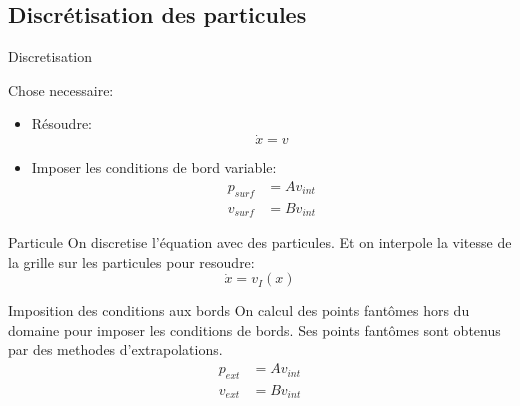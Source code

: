 \subsection{Discrétisation des particules}
\begin{frame}{Discretisation}

\begin{block}{Chose necessaire:}
 \begin{itemize}
  \item Résoudre:
  \begin{equation*}
   \dot{x}=v
  \end{equation*}
  \item Imposer les conditions de bord variable:
   \begin{align*}
 p_{surf}&=Av_{int}\\
 v_{surf}&=Bv_{int}
\end{align*}
 \end{itemize}

\end{block}

\begin{block}{Particule}
 On discretise l'équation avec des particules.
 Et on interpole la vitesse de la grille sur les particules pour resoudre:
   \begin{equation*}
   \dot{x}=v_{I}(x)
  \end{equation*}
\end{block}
\begin{block}{Imposition des conditions aux bords}
On calcul des points fantômes hors du domaine pour imposer les conditions de bords.
Ses points fantômes sont obtenus par des methodes d'extrapolations.
\begin{align*}
 p_{ext}&=Av_{int}\\
 v_{ext}&=Bv_{int}
\end{align*}
\end{block}

\end{frame}

